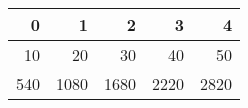 \begin{tabular}{rrrrr}
\toprule
0 & 1 & 2 & 3 & 4 \\
\midrule
10 & 20 & 30 & 40 & 50 \\
540 & 1080 & 1680 & 2220 & 2820 \\
\bottomrule
\end{tabular}
